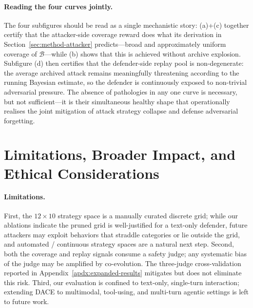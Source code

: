 \documentclass{article}
\newcommand{\method}{\textsc{DACE}\xspace}
\newcommand{\strategyspace}{\mathcal{B}}
\begin{document}
\paragraph{Reading the four curves jointly.}
The four subfigures should be read as a single mechanistic story: (a)+(c) together certify that the attacker-side coverage reward does what its derivation in Section~\ref{sec:method-attacker} predicts---broad and approximately uniform coverage of $\strategyspace$---while (b) shows that this is achieved without archive explosion. Subfigure (d) then certifies that the defender-side replay pool is non-degenerate: the average archived attack remains meaningfully threatening according to the running Bayesian estimate, so the defender is continuously exposed to non-trivial adversarial pressure. The absence of pathologies in any one curve is necessary, but not sufficient---it is their simultaneous healthy shape that operationally realises the joint mitigation of attack strategy collapse and defense adversarial forgetting.


\section{Limitations, Broader Impact, and Ethical Considerations}
\label{apdx:limitations}

\paragraph{Limitations.}
First, the $12\times10$ strategy space is a manually curated discrete grid; while our ablations indicate the pruned grid is well-justified for a text-only defender, future attackers may exploit behaviors that straddle categories or lie outside the grid, and automated / continuous strategy spaces are a natural next step. Second, both the coverage and replay signals consume a safety judge; any systematic bias of the judge may be amplified by co-evolution. The three-judge cross-validation reported in Appendix~\ref{apdx:expanded-results} mitigates but does not eliminate this risk. Third, our evaluation is confined to text-only, single-turn interaction; extending \method to multimodal, tool-using, and multi-turn agentic settings is left to future work.
\end{document}
